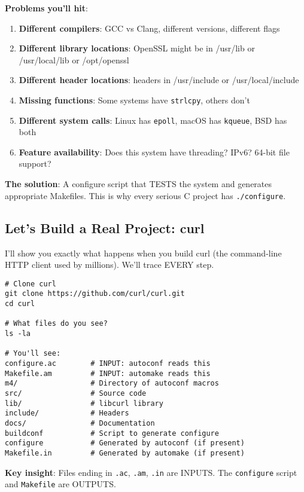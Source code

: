 \textbf{Problems you'll hit}:

\begin{enumerate}
    \item \textbf{Different compilers}: GCC vs Clang, different versions, different flags
    \item \textbf{Different library locations}: OpenSSL might be in /usr/lib or /usr/local/lib or /opt/openssl
    \item \textbf{Different header locations}: headers in /usr/include or /usr/local/include
    \item \textbf{Missing functions}: Some systems have \texttt{strlcpy}, others don't
    \item \textbf{Different system calls}: Linux has \texttt{epoll}, macOS has \texttt{kqueue}, BSD has both
    \item \textbf{Feature availability}: Does this system have threading? IPv6? 64-bit file support?
\end{enumerate}

\textbf{The solution}: A configure script that TESTS the system and generates appropriate Makefiles. This is why every serious C project has \texttt{./configure}.

\subsection{Let's Build a Real Project: curl}

I'll show you exactly what happens when you build curl (the command-line HTTP client used by millions). We'll trace EVERY step.

\begin{lstlisting}
# Clone curl
git clone https://github.com/curl/curl.git
cd curl

# What files do you see?
ls -la

# You'll see:
configure.ac        # INPUT: autoconf reads this
Makefile.am         # INPUT: automake reads this
m4/                 # Directory of autoconf macros
src/                # Source code
lib/                # libcurl library
include/            # Headers
docs/               # Documentation
buildconf           # Script to generate configure
configure           # Generated by autoconf (if present)
Makefile.in         # Generated by automake (if present)
\end{lstlisting}

\textbf{Key insight}: Files ending in \texttt{.ac}, \texttt{.am}, \texttt{.in} are INPUTS. The \texttt{configure} script and \texttt{Makefile} are OUTPUTS.

